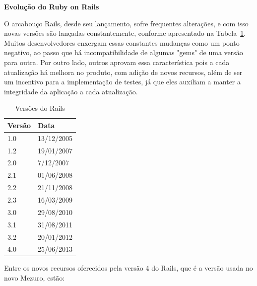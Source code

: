 

\textbf{Evolução do Ruby on Rails}

O arcabouço Rails, desde seu lançamento, sofre frequentes alterações, e com isso novas versões são lançadas constantemente, conforme apresentado na Tabela~\ref{tab:rails_versions}. Muitos desenvolvedores enxergam essas constantes mudanças como um ponto negativo, ao passo que há incompatibilidade de algumas "gems" de uma versão para outra. Por outro lado, outros aprovam essa característica pois a cada atualização há melhora no produto, com adição de novos recursos, além de ser um incentivo para a implementação de testes, já que eles auxiliam a manter a integridade da aplicação a cada atualização.

\begin{table}[H]
\begin{center}
    \begin{tabular}{ | l | l |}
    \hline
    Versão & Data \\ \hline
    1.0 & 13/12/2005 \\ \hline
    1.2 & 19/01/2007 \\ \hline
    2.0 & 7/12/2007 \\ \hline
    2.1 & 01/06/2008 \\ \hline
    2.2 & 21/11/2008 \\ \hline
    2.3 & 16/03/2009 \\ \hline
    3.0 & 29/08/2010 \\ \hline
    3.1 & 31/08/2011 \\ \hline
    3.2 & 20/01/2012 \\ \hline
    4.0 & 25/06/2013 \\ \hline
    \end{tabular}
    \caption{Versões do Rails}
    \label{tab:rails_versions}
\end{center}
\end{table}

Entre os novos recursos oferecidos pela versão 4 do Rails, que é a versão usada no novo Mezuro, estão:

